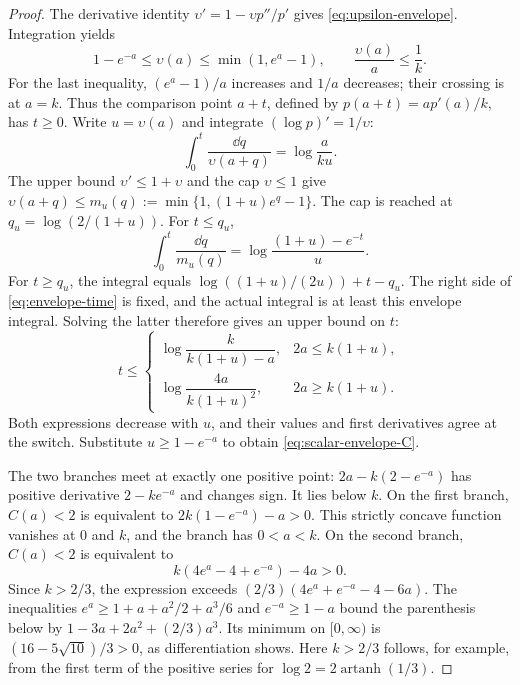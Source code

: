 \begin{proof}
The derivative identity $\upsilon'=1-\upsilon p''/p'$ gives
\eqref{eq:upsilon-envelope}. Integration yields
\[
 1-e^{-a}\leq\upsilon(a)\leq\min(1,e^a-1),\qquad
 \frac{\upsilon(a)}a\leq\frac1k.
\]
For the last inequality, $(e^a-1)/a$ increases and $1/a$ decreases;
their crossing is at $a=k$. Thus the comparison point $a+t$,
defined by $p(a+t)=ap'(a)/k$, has $t\geq0$. Write
$u=\upsilon(a)$ and integrate $(\log p)'=1/\upsilon$:
\begin{equation}
 \int_0^t\frac{\dd q}{\upsilon(a+q)}=\log\frac{a}{ku}.
 \label{eq:envelope-time}
\end{equation}
The upper bound $\upsilon'\leq1+\upsilon$ and the cap $\upsilon\leq1$
give
$\upsilon(a+q)\leq m_u(q):=\min\{1,(1+u)e^q-1\}$.
The cap is reached at $q_u=\log(2/(1+u))$. For $t\leq q_u$,
\[
 \int_0^t\frac{\dd q}{m_u(q)}
 =\log\frac{(1+u)-e^{-t}}u.
\]
For $t\geq q_u$, the integral equals $\log((1+u)/(2u))+t-q_u$.
The right side of \eqref{eq:envelope-time} is fixed, and the actual
integral is at least this envelope integral. Solving the latter
therefore gives an upper bound on $t$:
\[
 t\leq\begin{cases}
 \log\dfrac{k}{k(1+u)-a},&2a\leq k(1+u),\\[3pt]
 \log\dfrac{4a}{k(1+u)^2},&2a\geq k(1+u).
 \end{cases}
\]
Both expressions decrease with $u$, and their values and first
derivatives agree at the switch. Substitute $u\geq1-e^{-a}$ to
obtain \eqref{eq:scalar-envelope-C}.

The two branches meet at exactly one positive point: $2a-k(2-e^{-a})$
has positive derivative $2-ke^{-a}$ and changes sign. It lies below $k$.
On the first branch, $C(a)<2$ is equivalent to
$2k(1-e^{-a})-a>0$. This strictly concave function vanishes at
$0$ and $k$, and the branch has $0<a<k$. On the second branch,
$C(a)<2$ is equivalent to
\[
 k(4e^a-4+e^{-a})-4a>0.
\]
Since $k>2/3$, the expression exceeds
$(2/3)(4e^a+e^{-a}-4-6a)$. The inequalities
$e^a\geq1+a+a^2/2+a^3/6$ and $e^{-a}\geq1-a$ bound the
parenthesis below by $1-3a+2a^2+(2/3)a^3$. Its minimum on
$[0,\infty)$ is $(16-5\sqrt{10})/3>0$, as differentiation shows.
Here $k>2/3$ follows, for example, from the first term of the
positive series for $\log2=2\operatorname{artanh}(1/3)$.


\end{proof}
